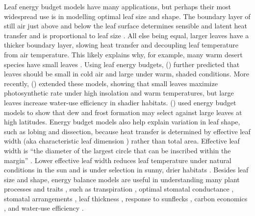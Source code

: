 \documentclass[11pt, oneside]{article}
\begin{document}
Leaf energy budget models have many applications, but perhaps their most widespread use is in modelling optimal leaf size and shape. The boundary layer of still air just above and below the leaf surface determines sensible and latent heat transfer and is proportional to leaf size \citep{Gates_1968}. All else being equal, larger leaves have a thicker boundary layer, slowing heat transfer and decoupling leaf temperature from air temperature. This likely explains why, for example, many warm desert species have small leaves \citep{Gibson_1998}. Using leaf energy budgets, \citeauthor{Parkhurst_Loucks_1972} (\citeyear{Parkhurst_Loucks_1972}) further predicted that leaves should be small in cold air and large under warm, shaded conditions. More recently, \citeauthor{Okajima_etal_2012} (\citeyear{Okajima_etal_2012}) extended these models, showing that small leaves maximize photosynthetic rate under high insolation and warm temperatures, but large leaves increase water-use efficiency in shadier habitats. \citeauthor{Wright_etal_2017} (\citeyear{Wright_etal_2017}) used energy budget models to show that dew and frost formation may select against large leaves at high latitudes. Energy budget models also help explain variation in leaf shape, such as lobing and dissection, because heat transfer is determined by effective leaf width (aka characteristic leaf dimension \citep{Taylor_1975}) rather than total area. Effective leaf width is ``the diameter of the largest circle that can be inscribed within the margin'' \citep{Leigh_etal_2017}. Lower effective leaf width reduces leaf temperature under natural conditions in the sun \citep{Leigh_etal_2017} and is under selection in sunny, drier habitats \citep{Ferris_etal_2015}. Besides leaf size and shape, energy balance models are useful in understanding many plant processes and traits \citep{Gates_1965}, such as transpiration \citep{Gates_1968}, optimal stomatal conductance \citep{Buckley_etal_2014}, stomatal arrangements \citep{Foster_Smith_1986}, leaf thickness \citep{Leigh_etal_2012}, response to sunflecks \citep{Schymanski_etal_2013}, carbon economics \citep{Michaletz_etal_2016}, and water-use efficiency \citep{Schymanski_Or_2016}. 
\end{document}
